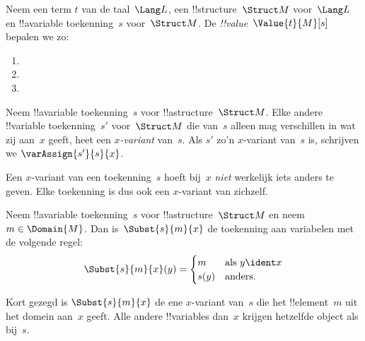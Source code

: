 \documentclass[openany]{memoir}
\begin{document}
\begin{defn}
Neem een term $t$ van de taal~$\Lang L$, een !!{structure}~$\Struct M$
voor~$\Lang L$ en !!a{variable} toekenning~$s$ voor~$\Struct M$.
De \emph{!!{value}}~$\Value{t}{M}[s]$ bepalen we zo:
\begin{enumerate}
\item {}
\item {}
\item {}
\end{enumerate}
\end{defn}

\begin{defn}[$x$-variant]
Neem !!a{variable} toekenning~$s$ voor !!a{structure}~$\Struct M$.
Elke andere !!{variable} toekenning~$s'$ voor~$\Struct M$ die van~$s$
alleen mag verschillen in wat zij aan~$x$ geeft, heet een
\emph{$x$-variant} van~$s$. Als $s'$ zo'n $x$-variant van~$s$ is,
schrijven we $\varAssign{s'}{s}{x}$.
\end{defn}

\begin{explain}
Een $x$-variant van een toekenning~$s$ hoeft bij~$x$ \emph{niet}
werkelijk iets anders te geven. Elke toekenning is dus ook een
$x$-variant van zichzelf.
\end{explain}

\begin{defn}
  Neem !!a{variable} toekenning~$s$ voor !!a{structure}~$\Struct M$
  en neem $m \in \Domain{M}$. Dan is~$\Subst{s}{m}{x}$ de toekenning
  aan variabelen met de volgende regel:
  \[\Subst{s}{m}{x}(y) = \begin{cases}
    m & \text{als } y \ident x\\
    s(y) & \text{anders}.
  \end{cases}\]
\end{defn}

Kort gezegd is $\Subst{s}{m}{x}$ de ene $x$-variant van~$s$ die het
!!{element}~$m$ uit het domein aan~$x$ geeft. Alle andere
!!{variable}s dan~$x$ krijgen hetzelfde object als bij~$s$.
\end{document}
